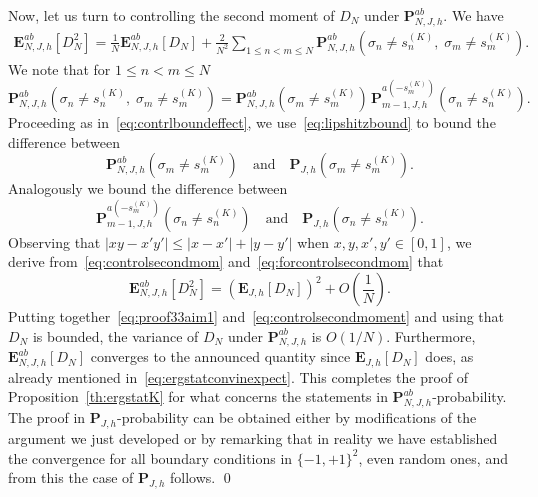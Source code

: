 \documentclass[10pt]{amsart}
\theoremstyle{definition}\newtheorem{defi}[theo]{Definition}\newtheorem{rema}[theo]{Remark}\newtheorem{exam}[theo]{Example}\newtheorem{exem}[theo]{Example}\newtheorem{nota}[theo]{Notation}
\newcommand{\bP}{\mathbf{P}}
\newcommand{\bE}{\mathbf{E}}
\newcommand{\gs}{\sigma}
\begin{document}
Now, let us turn to controlling the second moment of $D_N$ under $\bP^{ab}_{ N, J, h}$. We have
\begin{equation}\label{eq:controlsecondmom}
\begin{aligned}
\bE^{ab}_{N, J, h}\left[D_N^2\right]=\frac1N\bE^{ab}_{N, J, h}[D_N]+\frac2{N^2}\sum_{1 \le n < m\le N} \bP^{ab}_{N, J, h}\left(\gs_n \neq s^{(K)}_n,\; \gs_m \neq s^{(K)}_m\right).
\end{aligned}
\end{equation}
We note that for $1 \le n < m\le N$
\begin{equation}\label{eq:forcontrolsecondmom}
\bP_{ N, J, h}^{ab}\left(\gs_n \neq s^{(K)}_n,\;  \gs_m \neq s^{(K)}_m\right)
=
\bP_{N, J, h}^{ab}\left(\gs_m \neq s^{(K)}_m\right)
\, \bP_{m-1, J, h}^{a\left(-s^{(K)}_m\right)}\left(\gs_n \neq s^{(K)}_n\right).
\end{equation}
Proceeding as in~\eqref{eq:contrlboundeffect}, we use~\eqref{eq:lipshitzbound} to bound the difference between
\[
\bP_{N, J, h}^{ab}\left(\gs_m \neq s^{(K)}_m\right)\quad\text{and}\quad\bP_{J, h}\left(\gs_m \neq s^{(K)}_m\right).
\]
Analogously we bound the difference between 
\[
\bP_{m-1, J, h}^{a\left(-s^{(K)}_m\right)}\left(\gs_n \neq s^{(K)}_n\right)\quad\text{and}\quad \bP_{J, h}\left(\gs_n \neq s^{(K)}_n\right).
\]
Observing that $|xy-x'y'|\le |x-x'|+|y-y'|$ when $x,y, x', y'\in [0, 1]$, we derive from~\eqref{eq:controlsecondmom} and~\eqref{eq:forcontrolsecondmom} that
\begin{equation}\label{eq:controlsecondmoment}
\bE^{ab}_{N, J, h}\left[D_N^2\right]=\left(\bE_{J, h}\left[D_N\right]\right)^2+O\left(\frac1N\right).
\end{equation}
Putting together~\eqref{eq:proof33aim1} and~\eqref{eq:controlsecondmoment} and using that $D_N$ is bounded, the variance of $D_N$ under $\bP^{ab}_{ N, J, h}$ is $O\left(1/N\right)$. Furthermore, $\bE^{ab}_{N, J, h}[D_N]$ converges to the announced quantity since $\bE_{J, h}[D_N]$ does, as already mentioned in~\eqref{eq:ergstatconvinexpect}. This completes the proof of Proposition~\ref{th:ergstatK} for what concerns the statements in $\bP_{N,J, h}^{ab}$-probability. The proof in $\bP_{J, h}$-probability can be obtained either by modifications of the argument we just developed or by remarking that in reality we have established the convergence for all boundary conditions in $\{-1, +1\}^2$, even random ones, and from this the case of $\bP_{J, h}$ follows.
\qed


\appendix
\end{document}
